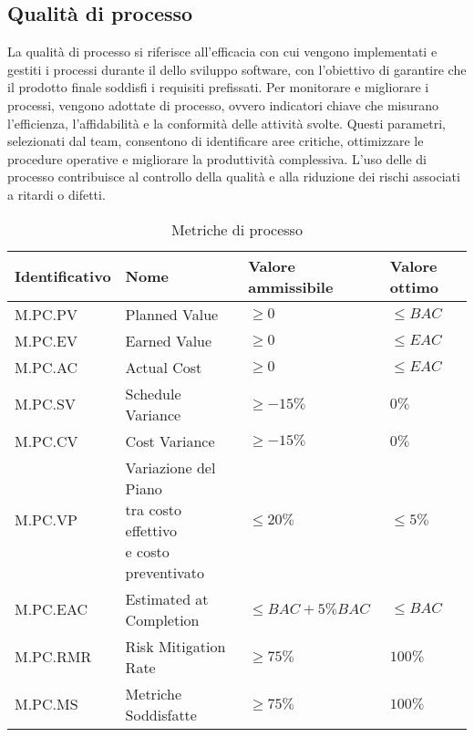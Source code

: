 \subsection{Qualità di processo}
\label{subsec:obiettivi_processo}
La qualità di processo si riferisce all'efficacia con cui vengono implementati e gestiti i processi durante il  dello sviluppo software, 
con l'obiettivo di garantire che il prodotto finale soddisfi i requisiti prefissati. 
Per monitorare e migliorare i processi, vengono adottate  di processo, ovvero indicatori chiave che misurano l'efficienza, l'affidabilità 
e la conformità delle attività svolte. 
Questi parametri, selezionati dal team, consentono di identificare aree critiche, ottimizzare le procedure operative e migliorare la produttività complessiva. 
L'uso delle  di processo contribuisce al controllo della qualità e alla riduzione dei rischi associati a ritardi o difetti.


\begin{table}[H]
    \centering
    \begin{tabular}{| l | l | l | l |}
    \hline
    \textbf{Identificativo} & 
    \textbf{Nome} &
    \textbf{Valore ammissibile} &
    \textbf{Valore ottimo}\\
    \hline
        M.PC.PV & Planned Value & $\geq 0$ & $\leq BAC$ \\
    \hline
        M.PC.EV & Earned Value & $\geq 0$ & $\leq EAC$ \\
    \hline
        M.PC.AC & Actual Cost & $\geq 0$ & $\leq EAC$ \\
    \hline
        M.PC.SV & Schedule Variance & $\geq -15\%$ & $0\%$ \\
    \hline
        M.PC.CV & Cost Variance & $\geq -15\%$ & $0\%$ \\
    \hline  
        M.PC.VP & \makecell{Variazione del Piano \\ tra costo effettivo \\ e costo preventivato} & $\leq 20\%$ & $\leq 5\%$ \\
    \hline
        M.PC.EAC & Estimated at Completion & $\leq BAC+5\% BAC$ & $\leq BAC$ \\
    \hline
        M.PC.RMR & Risk Mitigation Rate & $\geq 75\%$ & $100\%$ \\
    \hline
        M.PC.MS & Metriche Soddisfatte & $\geq 75\%$ & $100\%$ \\
    \hline
    \end{tabular}
    \caption{Metriche di processo}
    \label{tab:metriche_processo} 
\end{table}